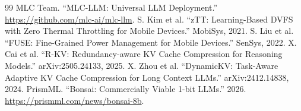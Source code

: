 \documentclass[sigconf, anonymous=false, screen=true]{acmart}
\begin{document}
\begin{thebibliography}{99}
 MLC Team. ``MLC-LLM: Universal LLM Deployment.'' \url{https://github.com/mlc-ai/mlc-llm}.
 S. Kim et al. ``zTT: Learning-Based DVFS with Zero Thermal Throttling for Mobile Devices.'' MobiSys, 2021.
 S. Liu et al. ``FUSE: Fine-Grained Power Management for Mobile Devices.'' SenSys, 2022.
 X. Cai et al. ``R-KV: Redundancy-aware KV Cache Compression for Reasoning Models.'' arXiv:2505.24133, 2025.
 X. Zhou et al. ``DynamicKV: Task-Aware Adaptive KV Cache Compression for Long Context LLMs.'' arXiv:2412.14838, 2024.
 PrismML. ``Bonsai: Commercially Viable 1-bit LLMs.'' 2026. \url{https://prismml.com/news/bonsai-8b}.
\end{thebibliography}
\end{document}
